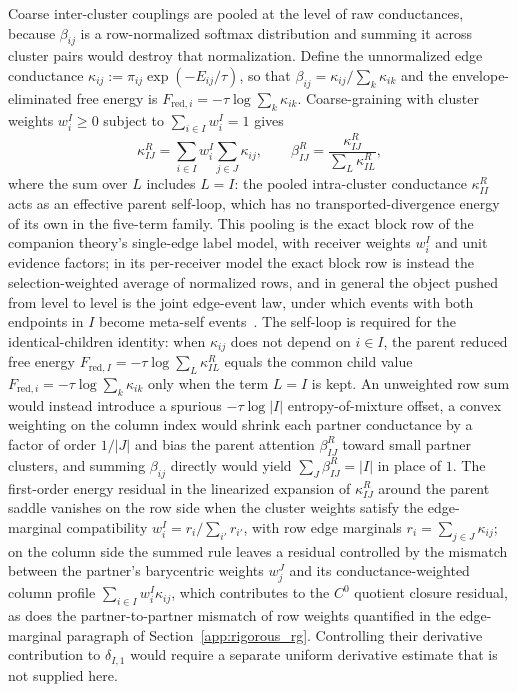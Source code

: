 Coarse inter-cluster couplings are pooled at the level of raw conductances, because $\beta_{ij}$ is a row-normalized softmax distribution and summing it across cluster pairs would destroy that normalization. Define the unnormalized edge conductance $\kappa_{ij} := \pi_{ij}\exp(-E_{ij}/\tau)$, so that $\beta_{ij} = \kappa_{ij}/\sum_k \kappa_{ik}$ and the envelope-eliminated free energy is $F_{\mathrm{red},i} = -\tau \log \sum_k \kappa_{ik}$. Coarse-graining with cluster weights $w_i^I \ge 0$ subject to $\sum_{i \in I} w_i^I = 1$ gives
\begin{equation}
\kappa_{IJ}^R = \sum_{i \in I} w_i^I \sum_{j \in J} \kappa_{ij}, \qquad \beta_{IJ}^R = \frac{\kappa_{IJ}^R}{\sum_L \kappa_{IL}^R},
\label{eq:rg_inter_cluster}
\end{equation}
where the sum over $L$ includes $L=I$: the pooled intra-cluster conductance $\kappa_{II}^R$ acts as an effective parent self-loop, which has no transported-divergence energy of its own in the five-term family. This pooling is the exact block row of the companion theory's single-edge label model, with receiver weights $w_i^I$ and unit evidence factors; in its per-receiver model the exact block row is instead the selection-weighted average of normalized rows, and in general the object pushed from level to level is the joint edge-event law, under which events with both endpoints in $I$ become meta-self events~\cite[Ch.~11]{DennisGaugeVFE2026}. The self-loop is required for the identical-children identity: when $\kappa_{ij}$ does not depend on $i \in I$, the parent reduced free energy $F_{\mathrm{red},I} = -\tau \log \sum_L \kappa_{IL}^R$ equals the common child value $F_{\mathrm{red},i} = -\tau \log \sum_k \kappa_{ik}$ only when the term $L=I$ is kept. An unweighted row sum would instead introduce a spurious $-\tau \log |I|$ entropy-of-mixture offset, a convex weighting on the column index would shrink each partner conductance by a factor of order $1/|J|$ and bias the parent attention $\beta_{IJ}^R$ toward small partner clusters, and summing $\beta_{ij}$ directly would yield $\sum_J \beta_{IJ}^R = |I|$ in place of $1$. The first-order energy residual in the linearized expansion of $\kappa_{IJ}^R$ around the parent saddle vanishes on the row side when the cluster weights satisfy the edge-marginal compatibility $w_i^I = r_i/\sum_{i'} r_{i'}$, with row edge marginals $r_i = \sum_{j \in J} \kappa_{ij}$; on the column side the summed rule leaves a residual controlled by the mismatch between the partner's barycentric weights $w_j^J$ and its conductance-weighted column profile $\sum_{i \in I} w_i^I \kappa_{ij}$, which contributes to the $C^0$ quotient closure residual, as does the partner-to-partner mismatch of row weights quantified in the edge-marginal paragraph of Section~\ref{app:rigorous_rg}. Controlling their derivative contribution to $\delta_{I,1}$ would require a separate uniform derivative estimate that is not supplied here.

